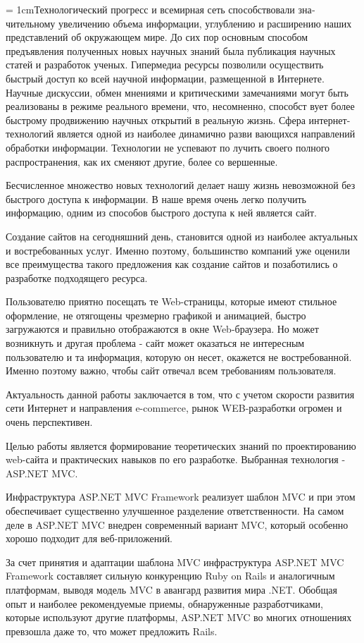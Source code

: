 \documentclass[14pt,a4paper]{extreport}
\begin{document}
	\parindent = 1cmТехнологический прогресс и всемирная сеть способствовали зна­чительному увеличению объема информации, углублению и расширению наших представлений об окружающем мире. До сих пор основным способом предъявления полученных новых научных знаний была публикация научных
статей и разработок ученых. Гипермедиа ресурсы позволили осуществить
быстрый доступ ко всей научной информации, размещенной в Интернете.
Научные дискуссии, обмен мнениями и критическими замечаниями могут
быть реализованы в режиме реального времени, что, несомненно, способст­
вует более быстрому продвижению научных открытий в реальную жизнь.
Сфера интернет-технологий является одной из наиболее динамично разви­
вающихся направлений обработки информации. Технологии не успевают по­
лучить своего полного распространения, как их сменяют другие, более со­
вершенные. \par
	Бесчисленное множество новых технологий делает нашу жизнь невозможной без быстрого доступа к информации. В наше время очень легко получить информацию, одним из способов быстрого доступа к ней является сайт.\par
	Создание сайтов на сегодняшний день, становится одной из наиболее актуальных и востребованных услуг. Именно поэтому, большинство компаний уже оценили все преимущества такого предложения как создание сайтов и позаботились о разработке подходящего ресурса.\par
	Пользователю приятно посещать те Web-страницы, которые имеют стильное оформление, не отягощены чрезмерно графикой и анимацией, быстро загружаются и правильно отображаются в окне Web-браузера. Но может возникнуть и другая проблема - сайт может оказаться не интересным пользователю и та информация, которую он несет, окажется не востребованной. Именно поэтому важно, чтобы сайт отвечал всем требованиям пользователя.\par
	Актуальность данной работы заключается в том, что с учетом скорости развития сети Интернет и направления e-commerce, рынок WEB-разработки огромен и очень перспективен.\par
	Целью работы является формирование теоретических знаний по проектированию web-сайта и практических навыков по его разработке. Выбранная технология - ASP.NET MVC.\par
	Инфраструктура ASP.NET MVC Framework реализует шаблон MVC и при этом обеспечивает существенно улучшенное разделение ответственности. На самом деле в ASP.NET MVC внедрен современный вариант MVC, который особенно хорошо подходит для веб-приложений.\par
	За счет принятия и адаптации шаблона MVC инфраструктура ASP.NET MVC Framework составляет сильную конкуренцию Ruby on Rails и аналогичным платформам, выводя модель MVC в авангард развития мира .NET. Обобщая опыт и наиболее рекомендуемые приемы, обнаруженные разработчиками, которые используют другие платформы, ASP.NET MVC во многих отношениях превзошла даже то, что может предложить Rails.\par	
\end{document}
